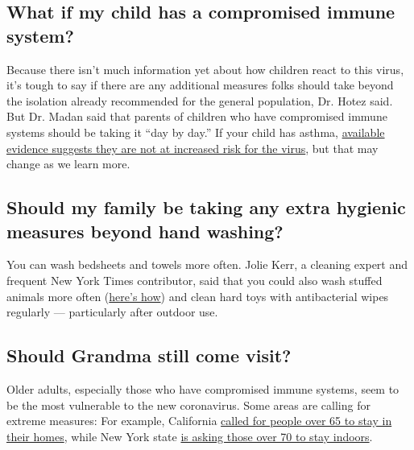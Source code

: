 \hypertarget{what-if-my-child-has-a-compromised-immune-system}{%
\subsection{What if my child has a compromised immune
system?}\label{what-if-my-child-has-a-compromised-immune-system}}

Because there isn't much information yet about how children react to
this virus, it's tough to say if there are any additional measures folks
should take beyond the isolation already recommended for the general
population, Dr. Hotez said. But Dr. Madan said that parents of children
who have compromised immune systems should be taking it ``day by day.''
If your child has asthma,
\href{https://parenting.nytimes3xbfgragh.onion/parent-life/coronavirus-asthma-kids}{available
evidence suggests they are not at increased risk for the virus}, but
that may change as we learn more.

\hypertarget{should-my-family-be-taking-any-extra-hygienic-measures-beyond-hand-washing}{%
\subsection{Should my family be taking any extra hygienic measures
beyond hand
washing?}\label{should-my-family-be-taking-any-extra-hygienic-measures-beyond-hand-washing}}

You can wash bedsheets and towels more often. Jolie Kerr, a cleaning
expert and frequent New York Times contributor, said that you could also
wash stuffed animals more often
(\href{https://parenting.nytimes3xbfgragh.onion/childrens-health/clean-stuffed-animals}{here's
how}) and clean hard toys with antibacterial wipes regularly ---
particularly after outdoor use.

\hypertarget{should-grandma-still-come-visit}{%
\subsection{Should Grandma still come
visit?}\label{should-grandma-still-come-visit}}

Older adults, especially those who have compromised immune systems, seem
to be the most vulnerable to the new coronavirus. Some areas are calling
for extreme measures: For example, California
\href{https://www.nytimes3xbfgragh.onion/2020/03/15/us/coronavirus-newsom-california-seniors-restaurants-bars.html}{called
for people over 65 to stay in their homes}, while New York state
\href{https://www.governor.ny.gov/news/video-audio-photos-rush-transcript-governor-cuomo-signs-new-york-state-pause-executive-order}{is
asking those over 70 to stay indoors}.

